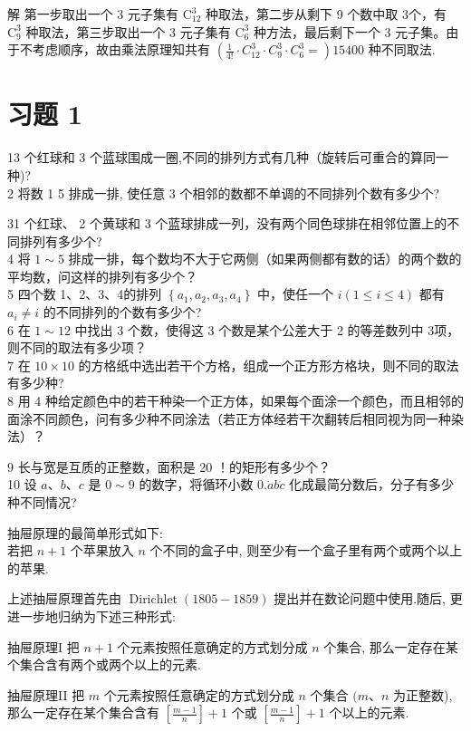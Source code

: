 \documentclass[10pt]{article}
\begin{document}
解 第一步取出一个 3 元子集有 $\mathrm{C}_{12}^{3}$ 种取法，第二步从剩下 9 个数中取 3个，有 $\mathrm{C}_{9}^{3}$ 种取法，第三步取出一个 3 元子集有 $\mathrm{C}_{6}^{3}$ 种方法，最后剩下一个 3 元子集。由于不考虑顺序，故由乘法原理知共有 $\left(\frac{1}{4!} \cdot C_{12}^{3} \cdot C_{9}^{3} \cdot C_{6}^{3}=\right) 15400$ 种不同取法.

\section{习题 1}
13 个红球和 3 个蓝球围成一圈,不同的排列方式有几种（旋转后可重合的算同一种)?\\
2 将数 1 5 排成一排, 使任意 3 个相邻的数都不单调的不同排列个数有多少个?

31 个红球、 2 个黄球和 3 个蓝球排成一列，没有两个同色球排在相邻位置上的不同排列有多少个?\\
4 将 $1 \sim 5$ 排成一排，每个数均不大于它两侧（如果两侧都有数的话）的两个数的平均数，问这样的排列有多少个？\\
5 四个数 1、2、3、4的排列 $\left\{a_{1}, a_{2}, a_{3}, a_{4}\right\}$ 中，使任一个 $i(1 \leqslant i \leqslant 4)$ 都有 $a_{i} \neq i$ 的不同排列的个数有多少个?\\
6 在 $1 \sim 12$ 中找出 3 个数，使得这 3 个数是某个公差大于 2 的等差数列中 3项，则不同的取法有多少项？\\
7 在 $10 \times 10$ 的方格纸中选出若干个方格，组成一个正方形方格块，则不同的取法有多少种?\\
8 用 4 种给定颜色中的若干种染一个正方体，如果每个面涂一个颜色，而且相邻的面涂不同颜色，问有多少种不同涂法（若正方体经若干次翻转后相同视为同一种染法）？

9 长与宽是互质的正整数，面积是 20 ！的矩形有多少个？\\
10 设 $a 、 b 、 c$ 是 $0 \sim 9$ 的数字，将循环小数 $0 . \dot{a} b \dot{c}$ 化成最简分数后，分子有多少种不同情况?

抽屉原理的最简单形式如下:\\
若把 $n+1$ 个苹果放入 $n$ 个不同的盒子中, 则至少有一个盒子里有两个或两个以上的苹果.

上述抽屉原理首先由 $\operatorname{Dirichlet}(1805-1859)$ 提出并在数论问题中使用.随后, 更进一步地归纳为下述三种形式:

抽屉原理I 把 $n+1$ 个元素按照任意确定的方式划分成 $n$ 个集合, 那么一定存在某个集合含有两个或两个以上的元素.

抽屉原理II 把 $m$ 个元素按照任意确定的方式划分成 $n$ 个集合 $(m 、 n$ 为正整数), 那么一定存在某个集合含有 $\left[\frac{m-1}{n}\right]+1$ 个或 $\left[\frac{m-1}{n}\right]+1$ 个以上的元素.
\end{document}
